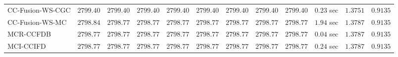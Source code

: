 \begin{table}[H]
\begin{tabular}{lrrrrrrrrrrr}
    CC-Fusion-WS-CGC & $      2799.40$ & $      2799.40$ & $      2799.40$ & $      2799.40$ & $      2799.40$ & $      2799.40$ & $      2799.40$ & $      2799.40$ & $         0.23$ sec    & $       1.3751$  & $       0.9135$ \\ 
     CC-Fusion-WS-MC & $      2798.84$ & $      2798.77$ & $      2798.77$ & $      2798.77$ & $      2798.77$ & $      2798.77$ & $      2798.77$ & $      2798.77$ & $         1.94$ sec    & $       1.3787$  & $       0.9135$ \\ 
\cmidrule{1-1} 
           MCR-CCFDB & $      2798.77$ & $      2798.77$ & $      2798.77$ & $      2798.77$ & $      2798.77$ & $      2798.77$ & $      2798.77$ & $      2798.77$ & $         0.04$ sec    & $       1.3787$  & $       0.9135$ \\ 
\cmidrule{1-1} 
           MCI-CCIFD & $      2798.77$ & $      2798.77$ & $      2798.77$ & $      2798.77$ & $      2798.77$ & $      2798.77$ & $      2798.77$ & $      2798.77$ & $         0.24$ sec    & $       1.3787$  & $       0.9135$ \\ 
\bottomrule
\end{tabular}
\end{table}

